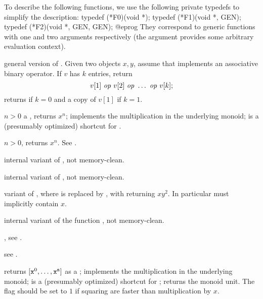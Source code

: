 To describe the following functions, we use the following private typedefs
to simplify the description:
\bprog
  typedef (*F0)(void *);
  typedef (*F1)(void *, GEN);
  typedef (*F2)(void *, GEN, GEN);
@eprog
\noindent They correspond to generic functions with one and two arguments
respectively (the  argument provides some arbitrary evaluation
context).

general version of . Given two objects
$x,y$, assume that  implements an associative binary
operator. If $v$ has $k$ entries, return
$$v[1]~\hbox{\it op\/}~v[2]~\hbox{\it op\/}~\ldots ~\hbox{\it op\/}~v[k];$$
returns  if $k = 0$ and a copy of $v[1]$ if $k = 1$.

 $n > 0$ a
, returns $x^n$;  implements the multiplication
in the underlying monoid;  is a (presumably optimized) shortcut for
.

 $n > 0$,
returns $x^n$. See .

internal variant of , not memory-clean.

internal variant of , not memory-clean.

 variant
of , where  is replaced by , with
 returning $xy^2$. In particular  must implicitly
contain $x$.

internal variant of the function , not memory-clean.

, see
.

see .

returns $[{\tt x}^0, \dots, {\tt x}^{\tt n}]$ as a ;  implements the multiplication in the underlying monoid; 
is a (presumably optimized) shortcut for ; 
returns the monoid unit. The flag  should be set to $1$ if
squaring are faster than multiplication by $x$.

